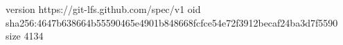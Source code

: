 version https://git-lfs.github.com/spec/v1
oid sha256:4647b638664b55590465e4901b848668fcfce54e72f3912becaf24ba3d7f5590
size 4134
